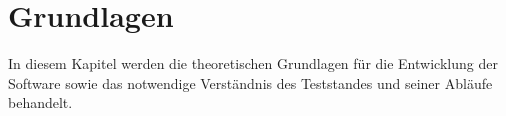 
\newpage
\section{Grundlagen}
\label{sec:grundlagen}


In diesem Kapitel werden die theoretischen Grundlagen für die Entwicklung der Software sowie das notwendige Verständnis des Teststandes und seiner Abläufe behandelt.












